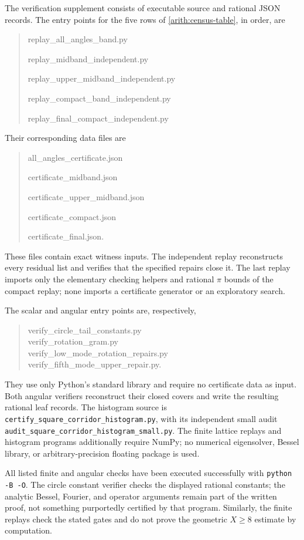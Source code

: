 \documentclass[11pt,reqno]{amsart}
\numberwithin{equation}{section}
\begin{document}
The verification supplement consists of executable source and rational
JSON records.  The entry points for the five rows of
\eqref{arith:census-table}, in order, are
\begin{quote}\ttfamily\small
 replay\_all\_angles\_band.py\par
 replay\_midband\_independent.py\par
 replay\_upper\_midband\_independent.py\par
 replay\_compact\_band\_independent.py\par
 replay\_final\_compact\_independent.py
\end{quote}
Their corresponding data files are
\begin{quote}\ttfamily\small
 all\_angles\_certificate.json\par
 certificate\_midband.json\par
 certificate\_upper\_midband.json\par
 certificate\_compact.json\par
 certificate\_final.json.
\end{quote}
These files contain exact witness inputs.  The independent replay
reconstructs every residual list and verifies that the specified repairs
close it.  The last replay imports only the elementary checking helpers
and rational $\pi$ bounds of the compact replay; none imports a
certificate generator or an exploratory search.

The scalar and angular entry points are, respectively,
\begin{quote}
\ttfamily
verify\_circle\_tail\_constants.py\\
verify\_rotation\_gram.py\\
verify\_low\_mode\_rotation\_repairs.py\\
verify\_fifth\_mode\_upper\_repair.py.
\end{quote}
They use only Python's standard library and require no certificate data
as input.  Both angular verifiers reconstruct their
closed covers and write the resulting rational leaf records.
The histogram source is
\nolinkurl{certify_square_corridor_histogram.py}, with its independent
small audit \nolinkurl{audit_square_corridor_histogram_small.py}.
The finite lattice replays and histogram programs additionally require
NumPy; no numerical eigensolver, Bessel library, or arbitrary-precision
floating package is used.

All listed finite and angular checks have been executed successfully
with \texttt{python -B -O}.  The circle constant verifier checks the
displayed rational constants; the analytic Bessel, Fourier, and
operator arguments remain part of the written proof, not something
purportedly certified by that program.  Similarly, the finite replays
check the stated gates and do not prove the geometric $X\ge8$ estimate
by computation.
\end{document}
